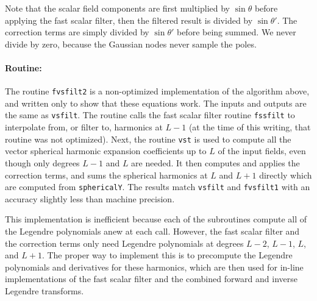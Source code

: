 Note that the scalar field components are first multiplied by $\sin\theta$ before applying the fast scalar filter, then the filtered result is divided by $\sin\theta'$. The correction terms are simply divided by $\sin\theta'$ before being summed. We never divide by zero, because the Gaussian nodes never sample the poles.    

\paragraph{Routine:} 
The routine \texttt{fvsfilt2} is a non-optimized implementation of the algorithm above, and written only to show that these equations work. The inputs and outputs are the same as \texttt{vsfilt}. The routine calls the fast scalar filter routine \texttt{fssfilt} to interpolate from, or filter to, harmonics at $L-1$ (at the time of this writing, that routine was not optimized). Next, the routine \texttt{vst} is used to compute all the vector spherical harmonic expansion coefficients up to $L$ of the input fields, even though only degrees $L-1$ and $L$ are needed. It then computes and applies the correction terms, and sums the spherical harmonics at $L$ and $L+1$ directly which are computed from \texttt{sphericalY}. The results match \texttt{vsfilt} and \texttt{fvsfilt1} with an accuracy slightly less than machine precision.

This implementation is inefficient because each of the subroutines compute all of the Legendre polynomials anew at each call. However, the fast scalar filter and the correction terms only need Legendre polynomials at degrees $L-2$, $L-1$, $L$, and $L+1$. The proper way to implement this is to precompute the Legendre polynomials and derivatives for these harmonics, which are then used for in-line implementations of the fast scalar filter and the combined forward and inverse Legendre transforms.

{\footnotesize
{}
}




